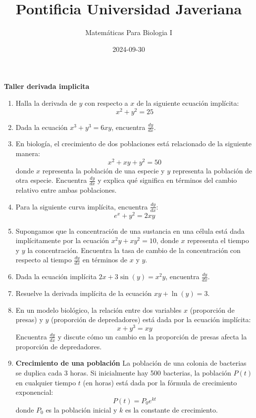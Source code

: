 \documentclass[
]{article}
\title{Pontificia Universidad Javeriana}
\author{Matemáticas Para Biologia I}
\date{2024-09-30}
\begin{document}
\maketitle


\textbf{Taller derivada implicita}

\begin{enumerate}
\def\labelenumi{\arabic{enumi}.}
\item
  Halla la derivada de \(y\) con respecto a \(x\) de la siguiente
  ecuación implícita: \[ x^2 + y^2 = 25 \]
\item
  Dada la ecuación \(x^3 + y^3 = 6xy\), encuentra \(\frac{dy}{dx}\).
\item
  En biología, el crecimiento de dos poblaciones está relacionado de la
  siguiente manera: \[ x^2 + xy + y^2 = 50 \] donde \(x\) representa la
  población de una especie y \(y\) representa la población de otra
  especie. Encuentra \(\frac{dy}{dx}\) y explica qué significa en
  términos del cambio relativo entre ambas poblaciones.
\item
  Para la siguiente curva implícita, encuentra \(\frac{dy}{dx}\):
  \[ e^{x} + y^2 = 2xy \]
\item
  Supongamos que la concentración de una sustancia en una célula está
  dada implícitamente por la ecuación \(x^2y + xy^2 = 10\), donde \(x\)
  representa el tiempo y \(y\) la concentración. Encuentra la tasa de
  cambio de la concentración con respecto al tiempo \(\frac{dy}{dx}\) en
  términos de \(x\) y \(y\).
\item
  Dada la ecuación implícita \(2x + 3\sin(y) = x^2y\), encuentra
  \(\frac{dy}{dx}\).
\item
  Resuelve la derivada implícita de la ecuación \(xy + \ln(y) = 3\).
\item
  En un modelo biológico, la relación entre dos variables \(x\)
  (proporción de presas) y \(y\) (proporción de depredadores) está dada
  por la ecuación implícita: \[ x + y^3 = xy \] Encuentra
  \(\frac{dy}{dx}\) y discute cómo un cambio en la proporción de presas
  afecta la proporción de depredadores.
\item
  \textbf{Crecimiento de una población} La población de una colonia de
  bacterias se duplica cada 3 horas. Si inicialmente hay 500 bacterias,
  la población \(P(t)\) en cualquier tiempo \(t\) (en horas) está dada
  por la fórmula de crecimiento exponencial: \[ P(t) = P_0 e^{kt} \]
  donde \(P_0\) es la población inicial y \(k\) es la constante de
  crecimiento.
\end{enumerate}
\end{document}
